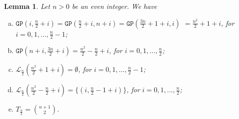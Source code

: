 \documentclass[journal,draftcls,onecolumn,12pt,twoside]{IEEEtran}
\newtheorem{lemma}[theorem]{\bf Lemma}
\newcommand{\GP}{{\mathtt{GP}}}
\begin{document}
\medskip

\begin{lemma}\label{lemma:GP_even}
Let $n>0$ be an even integer.
We have
\begin{enumerate}[(a)]
\item $\GP(i,\frac{n}{2}+i) = \GP(\frac{n}{2}+i,n+i) = \GP(\frac{3n}{2}+1+i,i)$ $= \frac{n^2}{2}+1+i$, for $i=0,1,\ldots, \frac{n}{2}-1$;
\smallskip
\item $\GP(n+i,\frac{3n}{2}+i)=\frac{n^2}{2}-\frac{n}{2}+i$, for $i=0,1,\ldots, \frac{n}{2}$;
\smallskip
\item $\mathcal{L}_{\frac{n}{2}}(\frac{n^2}{2}+1+i) = \emptyset$, for $i=0,1,\ldots, \frac{n}{2}-1$; 
\smallskip
\item $\mathcal{L}_{\frac{n}{2}}(\frac{n^2}{2}-\frac{n}{2}+i) = \{(i,\frac{n}{2}-1+i)\}$, for $i=0,1,\ldots, \frac{n}{2}$;
\smallskip
\item $T_{\frac{n}{2}}={n+1\choose 2}$.
\end{enumerate}
\end{lemma}
\end{document}
